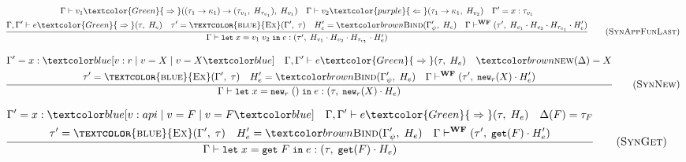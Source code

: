 \begin{figure}[H]
    \begin{equation}
        \frac{
            \begin{gathered}
                \Gamma \vdash v_1 \textcolor{Green}{\;\Rightarrow\;} ((\tau_1 \rightarrow \kappa_1) \rightarrow (\tau_{v_1}, \; H_{\tau_{v_1}}), \; H_{v_1}) \quad \Gamma \vdash v_2 \textcolor{purple}{\;\Leftarrow\;} (\tau_1 \rightarrow \kappa_1, \; H_{v_2}) \quad \Gamma' = x : \tau_{v_1} \\
                \Gamma, \Gamma' \vdash e \textcolor{Green}{\;\Rightarrow\;} (\tau, \; H_e) \quad \tau' = \textsc{\textcolor{blue}{Ex}}(\Gamma', \;\tau) \quad H_e' = \bind(\Gamma'_{\psi}, \;H_e) \quad \Gamma \vdash^{\textbf{WF}} (\tau', \; H_{v_1} \cdot H_{v_2} \cdot H_{\tau_{v_1}} \cdot H_e')
            \end{gathered}
        }{
            \Gamma \vdash \texttt{\small{let}}\;x = v_1\;v_2\;\texttt{\small{in}}\;e : (\tau', \; H_{v_1} \cdot H_{v_2} \cdot H_{\tau_{v_1}} \cdot H_e')
        }
        \tag{\textsc{SynAppFunLast}}
        \label{eq:synappfunlast}
    \end{equation}

    \begin{equation}
        \frac{
            \begin{gathered}
                \Gamma' = x: \under{v: r \;|\; v = X \;|\; v = X} \quad \Gamma, \Gamma' \vdash e \textcolor{Green}{\;\Rightarrow\;} (\tau, \; H_e) \quad \nextd(\Delta) = X \\
                \tau' = \textsc{\textcolor{blue}{Ex}}(\Gamma', \; \tau) \quad H_e' = \bind(\Gamma'_{\psi}, \;H_e) \quad \Gamma \vdash^{\textbf{WF}} (\tau', \; \texttt{\small{new}}_r(X) \cdot H_e')
            \end{gathered}
        }{
            \Gamma \vdash \texttt{\small{let}}\;x = \texttt{\small{new}}_r\;()\;\texttt{\small{in}}\;e : (\tau, \;\texttt{\small{new}}_r(X) \cdot H_e)
        }
        \tag{\textsc{SynNew}}
        \label{eq:synew}
    \end{equation}

    \begin{equation}
        \frac{
            \begin{gathered}
                \Gamma' = x : \under{v: api \;|\; v = F \;|\; v = F} \quad \Gamma, \Gamma' \vdash e \textcolor{Green}{\;\Rightarrow\;} (\tau, \; H_e) \quad \Delta(F) = \tau_{F} \\
                \tau' = \textsc{\textcolor{blue}{Ex}}(\Gamma', \;\tau) \quad H_e' = \bind(\Gamma'_{\psi}, \;H_e) \quad \Gamma \vdash^{\textbf{WF}} (\tau', \; \texttt{\small{get}}(F) \cdot H_e')
            \end{gathered}
        }{
            \Gamma \vdash \texttt{\small{let}}\;x = \texttt{\small{get}}\;F\;\texttt{\small{in}}\;e : (\tau, \; \texttt{\small{get}}(F) \cdot H_e)
        }
        \tag{\textsc{SynGet}}
        \label{eq:syngetapi}
    \end{equation}


\end{figure}
